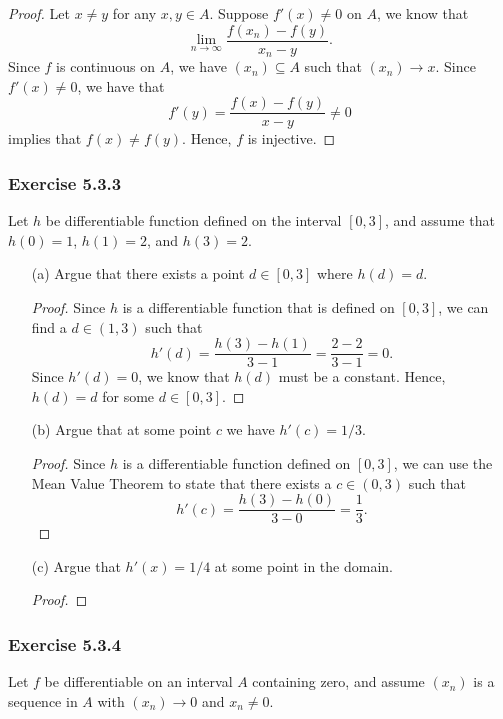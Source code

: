 \begin{proof}
Let \( x \neq y  \) for any \( x,y \in A  \). Suppose \( f'(x) \neq 0  \) on \( A  \), we know that 
\[  \lim_{ n \to \infty  } \frac{ f(x_n) - f(y) }{ x_n - y   }. \]
Since \( f  \) is continuous on \( A  \), we have \( (x_n) \subseteq A  \) such that \( (x_n) \to x  \). Since \( f'(x) \neq 0  \), we have that 
\[  f'(y) = \frac{ f(x) - f(y)  }{ x - y  } \neq 0   \] implies that \( f(x) \neq f(y) \). Hence, \( f  \) is injective.
\end{proof}

\subsubsection{Exercise 5.3.3} Let \( h  \) be differentiable function defined on the interval \( [0,3] \), and assume that \( h(0) = 1  \), \( h(1) = 2  \), and \( h(3) = 2  \).
\begin{enumerate}
    \item[(a)] Argue that there exists a point \( d \in [0,3]  \) where \( h(d) = d  \).
        \begin{proof}
            Since \( h  \) is a differentiable function that is defined on \( [0,3] \), we can find a \( d \in (1,3)  \) such that 
            \[  h'(d) = \frac{ h(3) - h(1)  }{ 3 - 1  } = \frac{ 2 - 2  }{ 3 - 1  } = 0. \]
            Since \( h'(d) = 0  \), we know that \( h(d)  \) must be a constant. Hence, \( h(d) = d  \) for some \( d \in [0,3] \).
        \end{proof}
    \item[(b)] Argue that at some point \( c  \) we have \( h'(c) = 1 / 3  \).
        \begin{proof}
            Since \( h  \) is a differentiable function defined on \( [0,3]  \), we can use the Mean Value Theorem to state that there exists a \( c \in (0,3) \) such that 
            \[ h'(c) = \frac{ h(3) - h(0) }{ 3 - 0  } = \frac{ 1 }{ 3 }.  \]
        \end{proof}
    \item[(c)] Argue that \( h'(x) = 1/4 \) at some point in the domain.
        \begin{proof}
        
        \end{proof}
\end{enumerate}


\subsubsection{Exercise 5.3.4} Let \( f  \) be differentiable on an interval \( A  \) containing zero, and assume \( (x_n)  \) is a sequence in \( A  \) with \( (x_n) \to 0  \) and \( x_n \neq 0 \).

